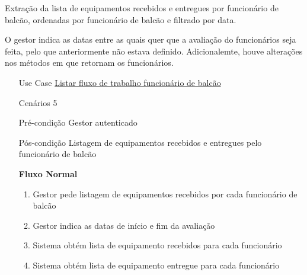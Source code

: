 \documentclass[../relatorio.tex]{subfiles}
\begin{document}
Extração da lista de equipamentos recebidos e entregues por funcionário de balcão,
ordenadas por funcionário de balcão e filtrado por data.

O gestor indica as datas entre as quais quer que a avaliação do funcionários seja feita, pelo que
anteriormente não estava definido.
Adicionalemte, houve alterações nos métodos em que retornam os funcionários.

\begin{itemize}
    \item[Use Case] {\underline{Listar fluxo de trabalho funcionário de balcão}}
    \item[Cenários] {5}
    \item[Pré-condição] {Gestor autenticado}
    \item[Pós-condição] {Listagem de equipamentos recebidos e entregues pelo funcionário de balcão}
          \begin{flushleft}
              \textbf{Fluxo Normal}
          \end{flushleft}
          \begin{enumerate}
              \item Gestor pede listagem de equipamentos recebidos por cada funcionário de balcão
              \item Gestor indica as datas de início e fim da avaliação
              \item Sistema obtém lista de equipamento recebidos para cada funcionário
              \item Sistema obtém lista de equipamento entregue para cada funcionário
          \end{enumerate}
\end{itemize}
\end{document}
